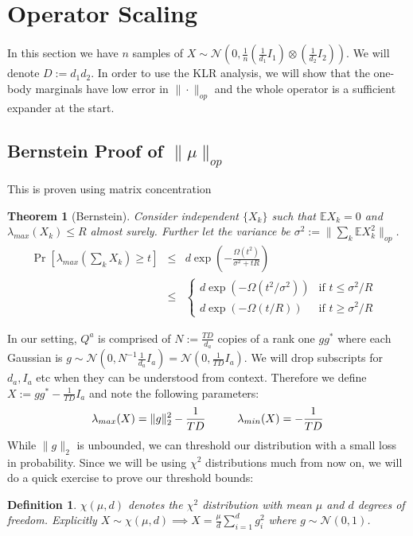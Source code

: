 \documentclass{article}
\newtheorem{theorem}{Theorem}
\newtheorem{definition}{Definition}
\newcommand{\E}{\mathbb{E}}
\newcommand\cN{\mathcal{N}}
\begin{document}
\section{Operator Scaling}
In this section we have $n$ samples of $X \sim \cN(0,\frac{1}{n} (\frac{1}{d_{1}} I_{1}) \otimes (\frac{1}{d_{2}} I_{2}))$. We will denote $D := d_{1} d_{2}$. In order to use the KLR analysis, we will show that the one-body marginals have low error in $\|\cdot\|_{op}$ and the whole operator is a sufficient expander at the start.

\subsection{Bernstein Proof of $\|\mu\|_{op}$}
This is proven using matrix concentration

\begin{theorem} [Bernstein]
Consider independent $\{X_{k}\}$ such that $\E X_{k} = 0$ and $\lambda_{max}(X_{k}) \leq R$ almost surely. Further let the variance be $\sigma^{2} := \|\sum_{k} \E X_{k}^{2} \|_{op}$.
\begin{eqnarray*} \Pr [ \lambda_{max} \left( \sum_{k} X_{k}  \right) \geq t ] & \leq & d \exp\left( - \frac{\Omega(t^{2})}{\sigma^{2} + t R} \right)
\\ & \leq & \begin{cases}
d \exp ( - \Omega(t^{2}/\sigma^{2}) ) & \text{if $t \leq \sigma^{2}/R$ }
\\ d \exp ( - \Omega(t/R) )           & \text{if $t \geq \sigma^{2}/R$}
\end{cases}
\end{eqnarray*}
\end{theorem}

In our setting, $Q^{a}$ is comprised of $N := \frac{TD}{d_{a}}$ copies of a rank one $g g^{*}$ where each Gaussian is $g \sim \mathcal{N}(0, N^{-1} \frac{1}{d_{a}} I_{a} ) = \mathcal{N}(0, \frac{1}{TD} I_{a}) $. We will drop subscripts for $d_{a}, I_{a}$ etc when they can be understood from context. Therefore we define $X := g g^{*} - \frac{1}{TD} I_{a}$ and note the following parameters:
\[ \lambda_{max}(X) = \|g\|_{2}^{2} - \frac{1}{TD} \hspace{10mm} \lambda_{min}(X) = - \frac{1}{TD}   \]
While $\|g\|_{2}$ is unbounded, we can threshold our distribution with a small loss in probability. Since we will be using $\chi^{2}$ distributions much from now on, we will do a quick exercise to prove our threshold bounds:

\begin{definition}
$\chi(\mu,d)$ denotes the $\chi^{2}$ distribution with mean $\mu$ and $d$ degrees of freedom. Explicitly $X \sim \chi(\mu,d) \implies X = \frac{\mu}{d} \sum_{i=1}^{d} g_{i}^{2}$
where $g \sim \mathcal{N}(0,1)$.
\end{definition}
\end{document}
